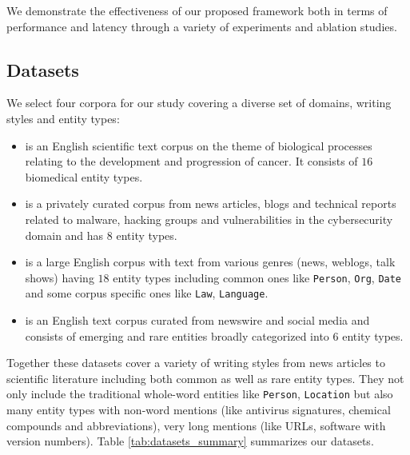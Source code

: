 We demonstrate the effectiveness of our proposed framework both in terms of performance and latency through a variety of experiments and ablation studies.

\subsection{Datasets}
We select four corpora for our study covering a diverse set of domains, writing styles and entity types:
\begin{itemize}

    \item {} \cite{pyysalo2015overview} is an English scientific text corpus on the theme of biological processes relating to the development and progression of cancer. It consists of $16$ biomedical entity types.
    
    \item {} is a privately curated corpus from news articles, blogs and technical reports related to malware, hacking groups and vulnerabilities in the cybersecurity domain and has $8$ entity types.
    
    \item {} \cite{weischedel2013ontonotes} is a large English corpus with text from various genres (news, weblogs, talk shows) having $18$ entity types including common ones like \texttt{Person}, \texttt{Org}, \texttt{Date} and some corpus specific ones like \texttt{Law}, \texttt{Language}.
    
    \item {} \cite{derczynski2017results} is an English text corpus curated from newswire and social media and consists of emerging and rare entities broadly categorized into $6$ entity types.
    
\end{itemize}

Together these datasets cover a variety of writing styles from news articles to scientific literature including both common as well as rare entity types. They not only include the traditional whole-word entities like \texttt{Person}, \texttt{Location} but also many entity types with non-word mentions (like antivirus signatures, chemical compounds and abbreviations), very long mentions (like URLs, software with version numbers). Table \ref{tab:datasets_summary} summarizes our datasets. 


